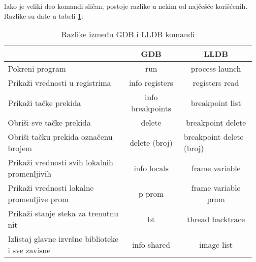 \documentclass[a4paper]{article}
\begin{document}
Iako je veliki deo komandi sličan, postoje razlike u nekim od 
najčešće korišćenih\cite{lldb}. Razlike su date u tabeli \ref{tab:tabela1}:


\begin{table}[h!]
\begin{center}
\caption{Razlike između GDB i LLDB komandi}
\begin{tabular}{|l |c|c|} \hline
                                                 & GDB            & LLDB                                                                  \\ \hline
\rowcolor[HTML]{C0C0C0} 
Pokreni program                              & run            & process launch                                                        \\
Prikaži vrednosti u registrima                    & info registers & registers read                                                        \\
\rowcolor[HTML]{C0C0C0} 
Prikaži tačke prekida                            & info breakpoints     & breakpoint list                                                       \\
Obriši sve tačke prekida                        & delete         & breakpoint delete                                                     \\
\rowcolor[HTML]{C0C0C0} 
Obriši tačku prekida označenu brojem           & delete (broj)  & \multicolumn{1}{l|}{\cellcolor[HTML]{C0C0C0}breakpoint delete (broj)} \\
Prikaži vrednosti svih lokalnih promenljivih      & info locals    & frame variable                                                        \\
\rowcolor[HTML]{C0C0C0} 
Prikaži vrednosti lokalne promenljive prom        & p prom         & frame variable prom                                                   \\
Prikaži stanje steka za trenutnu nit              & bt             & thread backtrace                                                      \\
\rowcolor[HTML]{C0C0C0} 
Izlistaj glavne izvršne biblioteke i sve zavisne & info shared    & image list                                                            \\ \hline
\end{tabular}
\label{tab:tabela1}
\end{center}
\end{table}
\end{document}
